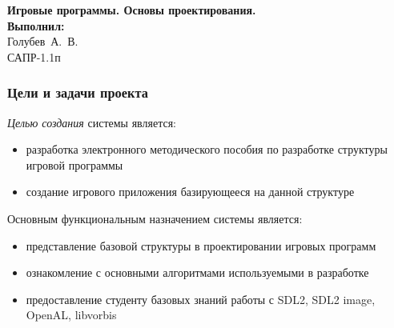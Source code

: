 \begin{frame}
    \begin{center}
        \vspace{3.0cm}
        \normalsize
        \textbf{Игровые программы. Основы проектирования.} \\
        \vspace{1.5cm}
        \raggedleft\small\textbf{Выполнил:}\\Голубев~А.~В.\\САПР-1.1п\\
        \vspace{1.8cm}
        \vspace{\fill}
         \the\year
    \end{center}
\end{frame}


\begin{frame}
    \frametitle{Цели и задачи проекта}

    \emph{Целью создания} системы является:
    \begin{itemize}
        \item разработка электронного методического пособия по разработке структуры игровой программы
        \item создание игрового приложения базирующееся на данной структуре
    \end{itemize}

    Основным функциональным назначением системы является:
    \begin{itemize}
        \item представление базовой структуры в проектировании игровых программ
        \item ознакомление с основными алгоритмами используемыми в разработке
        \item предоставление студенту базовых знаний работы с SDL2, SDL2 image, 
            OpenAL, libvorbis
    \end{itemize}
\end{frame}

